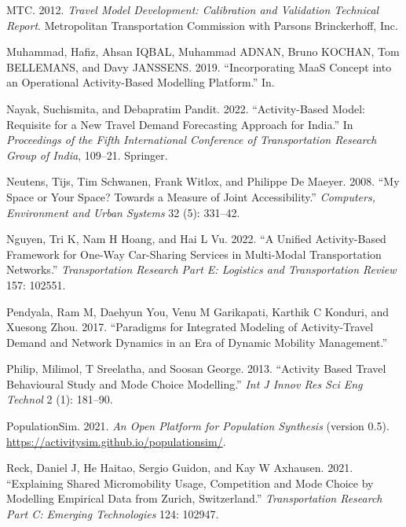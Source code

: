 \documentclass[12pt, oneside, openright]{byuthesis}
\newlength{\cslhangindent}
\newlength{\cslentryspacingunit} %
\newenvironment{CSLReferences}[2] %
 {%
  \setlength{\parindent}{0pt}
  \ifodd #1
  \let\oldpar\par
  \def\par{\hangindent=\cslhangindent\oldpar}
  \fi
  \setlength{\parskip}{#2\cslentryspacingunit}
 }%
 {}
\begin{document}
\begin{CSLReferences}{1}{0}
\leavevmode{}%
MTC. 2012. \emph{Travel Model Development: Calibration and Validation Technical Report}. Metropolitan Transportation Commission with Parsons Brinckerhoff, Inc.

\leavevmode{}%
Muhammad, Hafiz, Ahsan IQBAL, Muhammad ADNAN, Bruno KOCHAN, Tom BELLEMANS, and Davy JANSSENS. 2019. {``Incorporating MaaS Concept into an Operational Activity-Based Modelling Platform.''} In.

\leavevmode{}%
Nayak, Suchismita, and Debapratim Pandit. 2022. {``Activity-Based Model: Requisite for a New Travel Demand Forecasting Approach for India.''} In \emph{Proceedings of the Fifth International Conference of Transportation Research Group of India}, 109--21. Springer.

\leavevmode{}%
Neutens, Tijs, Tim Schwanen, Frank Witlox, and Philippe De Maeyer. 2008. {``My Space or Your Space? Towards a Measure of Joint Accessibility.''} \emph{Computers, Environment and Urban Systems} 32 (5): 331--42.

\leavevmode{}%
Nguyen, Tri K, Nam H Hoang, and Hai L Vu. 2022. {``A Unified Activity-Based Framework for One-Way Car-Sharing Services in Multi-Modal Transportation Networks.''} \emph{Transportation Research Part E: Logistics and Transportation Review} 157: 102551.

\leavevmode{}%
Pendyala, Ram M, Daehyun You, Venu M Garikapati, Karthik C Konduri, and Xuesong Zhou. 2017. {``Paradigms for Integrated Modeling of Activity-Travel Demand and Network Dynamics in an Era of Dynamic Mobility Management.''}

\leavevmode{}%
Philip, Milimol, T Sreelatha, and Soosan George. 2013. {``Activity Based Travel Behavioural Study and Mode Choice Modelling.''} \emph{Int J Innov Res Sci Eng Technol} 2 (1): 181--90.

\leavevmode{}%
PopulationSim. 2021. \emph{An Open Platform for Population Synthesis} (version 0.5). \url{https://activitysim.github.io/populationsim/}.

\leavevmode{}%
Reck, Daniel J, He Haitao, Sergio Guidon, and Kay W Axhausen. 2021. {``Explaining Shared Micromobility Usage, Competition and Mode Choice by Modelling Empirical Data from Zurich, Switzerland.''} \emph{Transportation Research Part C: Emerging Technologies} 124: 102947.


\end{CSLReferences}
\end{document}
